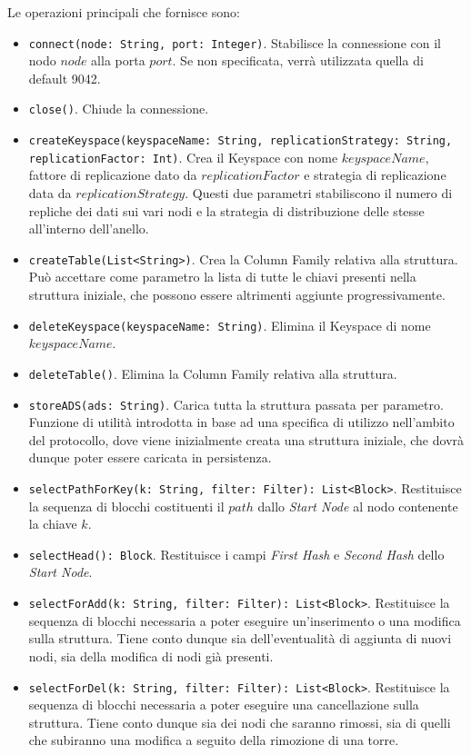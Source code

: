 		Le operazioni principali che fornisce sono:
		\begin{itemize}
			\item \verb!connect(node: String, port: Integer)!. Stabilisce la connessione con il nodo $ node $ alla porta $ port $. Se non specificata, verrà utilizzata quella di default 9042.
			\item \verb!close()!. Chiude la connessione.
			\item \verb!createKeyspace(keyspaceName: String, replicationStrategy: String, replicationFactor: Int)!. Crea il Keyspace con nome $ keyspaceName $, fattore di replicazione dato da $ replicationFactor $ e strategia di replicazione data da $ replicationStrategy $. Questi due parametri stabiliscono il numero di repliche dei dati sui vari nodi e la strategia di distribuzione delle stesse all'interno dell'anello.
			\item \verb!createTable(List<String>)!. Crea la Column Family relativa alla struttura. Può accettare come parametro la lista di tutte le chiavi presenti nella struttura iniziale, che possono essere altrimenti aggiunte progressivamente.
			\item \verb!deleteKeyspace(keyspaceName: String)!. Elimina il Keyspace di nome $ keyspaceName $.
			\item \verb!deleteTable()!. Elimina la Column Family relativa alla struttura.
			\item \verb!storeADS(ads: String)!. Carica tutta la struttura passata per parametro. Funzione di utilità introdotta in base ad una specifica di utilizzo nell'ambito del protocollo, dove viene inizialmente creata una struttura iniziale, che dovrà dunque poter essere caricata in persistenza.
			\item \verb!selectPathForKey(k: String, filter: Filter): List<Block>!. Restituisce la sequenza di blocchi costituenti il $ path $ dallo \textit{Start Node} al nodo contenente la chiave $ k $.
			\item \verb!selectHead(): Block!. Restituisce i campi \textit{First Hash} e \textit{Second Hash} dello \textit{Start Node}.
			\item \verb!selectForAdd(k: String, filter: Filter): List<Block>!. Restituisce la sequenza di blocchi necessaria a poter eseguire un'inserimento o una modifica sulla struttura. Tiene conto dunque sia dell'eventualità di aggiunta di nuovi nodi, sia della modifica di nodi già presenti.
			\item \verb!selectForDel(k: String, filter: Filter): List<Block>!. Restituisce la sequenza di blocchi necessaria a poter eseguire una cancellazione sulla struttura. Tiene conto dunque sia dei nodi che saranno rimossi, sia di quelli che subiranno una modifica a seguito della rimozione di una torre.

\end{itemize}
